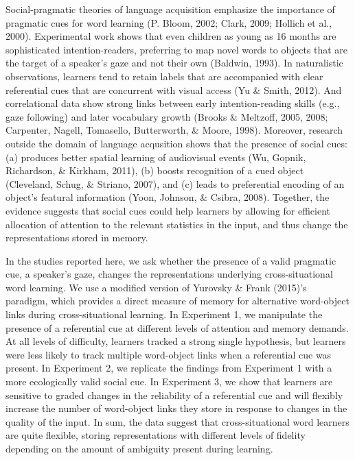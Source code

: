 \documentclass[a4paper,man,floatsintext]{apa6}
\begin{document}
Social-pragmatic theories of language acquisition emphasize the
importance of pragmatic cues for word learning (P. Bloom, 2002; Clark,
2009; Hollich et al., 2000). Experimental work shows that even children
as young as 16 months are sophisticated intention-readers, preferring to
map novel words to objects that are the target of a speaker's gaze and
not their own (Baldwin, 1993). In naturalistic observations, learners
tend to retain labels that are accompanied with clear referential cues
that are concurrent with visual access (Yu \& Smith, 2012). And
correlational data show strong links between early intention-reading
skills (e.g., gaze following) and later vocabulary growth (Brooks \&
Meltzoff, 2005, 2008; Carpenter, Nagell, Tomasello, Butterworth, \&
Moore, 1998). Moreover, research outside the domain of language
acqusition shows that the presence of social cues: (a) produces better
spatial learning of audiovisual events (Wu, Gopnik, Richardson, \&
Kirkham, 2011), (b) boosts recognition of a cued object (Cleveland,
Schug, \& Striano, 2007), and (c) leads to preferential encoding of an
object's featural information (Yoon, Johnson, \& Csibra, 2008).
Together, the evidence suggests that social cues could help learners by
allowing for efficient allocation of attention to the relevant
statistics in the input, and thus change the representations stored in
memory.

In the studies reported here, we ask whether the presence of a valid
pragmatic cue, a speaker's gaze, changes the representations underlying
cross-situational word learning. We use a modified version of Yurovsky
\& Frank (2015)'s paradigm, which provides a direct measure of memory
for alternative word-object links during cross-situational learning. In
Experiment 1, we manipulate the presence of a referential cue at
different levels of attention and memory demands. At all levels of
difficulty, learners tracked a strong single hypothesis, but learners
were less likely to track multiple word-object links when a referential
cue was present. In Experiment 2, we replicate the findings from
Experiment 1 with a more ecologically valid social cue. In Experiment 3,
we show that learners are sensitive to graded changes in the reliability
of a referential cue and will flexibly increase the number of
word-object links they store in response to changes in the quality of
the input. In sum, the data suggest that cross-situational word learners
are quite flexible, storing representations with different levels of
fidelity depending on the amount of ambiguity present during learning.
\end{document}
